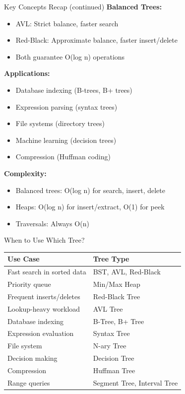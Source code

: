 \documentclass[aspectratio=169]{beamer}
\begin{document}
\begin{frame}{Key Concepts Recap (continued)}
  \textbf{Balanced Trees:}
  \begin{itemize}
    \item AVL: Strict balance, faster search
    \item Red-Black: Approximate balance, faster insert/delete
    \item Both guarantee O(log n) operations
  \end{itemize}

  \vspace{0.3cm}
  \textbf{Applications:}
  \begin{itemize}
    \item Database indexing (B-trees, B+ trees)
    \item Expression parsing (syntax trees)
    \item File systems (directory trees)
    \item Machine learning (decision trees)
    \item Compression (Huffman coding)
  \end{itemize}

  \vspace{0.3cm}
  \textbf{Complexity:}
  \begin{itemize}
    \item Balanced trees: O(log n) for search, insert, delete
    \item Heaps: O(log n) for insert/extract, O(1) for peek
    \item Traversals: Always O(n)
  \end{itemize}
\end{frame}

\begin{frame}{When to Use Which Tree?}
  \begin{table}
    \centering
    \small
    \begin{tabular}{|l|l|}
      \hline
      \textbf{Use Case} & \textbf{Tree Type} \\
      \hline
      Fast search in sorted data & BST, AVL, Red-Black \\
      \hline
      Priority queue & Min/Max Heap \\
      \hline
      Frequent inserts/deletes & Red-Black Tree \\
      \hline
      Lookup-heavy workload & AVL Tree \\
      \hline
      Database indexing & B-Tree, B+ Tree \\
      \hline
      Expression evaluation & Syntax Tree \\
      \hline
      File system & N-ary Tree \\
      \hline
      Decision making & Decision Tree \\
      \hline
      Compression & Huffman Tree \\
      \hline
      Range queries & Segment Tree, Interval Tree \\
      \hline
    \end{tabular}
  \end{table}
\end{frame}
\end{document}
